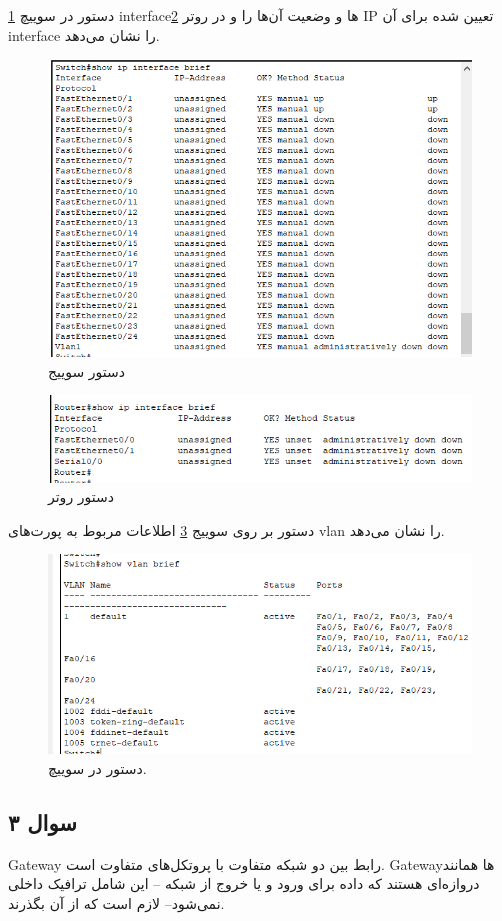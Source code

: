 \documentclass{perassignments}
\begin{document}
 	دستور 
 	در سوییچ  
 	\ref{fig:i}
 	interfaceها
 	و وضعیت آن‌ها را و در روتر
 	\ref{fig:h}
 	IP 
 	تعیین شده برای آن interface‌ را نشان می‌دهد.
 	\begin{figure}[H]
 		\centering
 		\includegraphics[width= 0.7\linewidth]{graphics/i.png}
 		\caption{دستور 	 سوییج}
 		\label{fig:i}
 	\end{figure}
 	\begin{figure}[H]
 		\centering
 		\includegraphics[width= 0.7\linewidth]{graphics/h.png}
 		\caption{دستور 	 روتر}
 		\label{fig:h}
 	\end{figure}
 	دستور 
 	بر روی سوییج 
 	\ref{fig:k}
 	اطلاعات مربوط به پورت‌های vlan را نشان می‌دهد. 
 	\begin{figure}[H]
 		\centering
 		\includegraphics[width= 0.7\linewidth]{graphics/k.png}
 		\caption{
 			دستور	
 			در سوییچ.}
 		\label{fig:k}
 	\end{figure}
 	\subsection{سوال ۳}
 	Gateway
 	رابط بین دو شبکه متفاوت با پروتکل‌های متفاوت است. Gateway‌ها همانند دروازه‌ای هستند که داده برای ورود و یا خروج از شبکه -- این شامل ترافیک داخلی نمی‌شود-- لازم است که از آن بگذرند.
\end{document}
